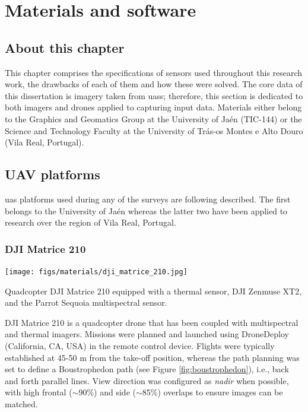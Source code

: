 \setchapterpreamble[u]{\margintoc}
\chapter{Materials and software}
\label{sec:materials}

\section*{About this chapter}

This chapter comprises the specifications of sensors used throughout this research work, the drawbacks of each of them and how these were solved. The core data of this dissertation is imagery taken from \acrshort{uas}s; therefore, this section is dedicated to both imagers and drones applied to capturing input data. Materials either belong to the Graphics and Geomatics Group at the University of Jaén (TIC-144) or the Science and Technology Faculty at the University of Trás-os Montes e Alto Douro (Vila Real, Portugal). 

\section{UAV platforms}

\acrshort{uas} platforms used during any of the surveys are following described. The first belongs to the University of Jaén whereas the latter two have been applied to research over the region of Vila Real, Portugal.

\subsection{DJI Matrice 210}

\begin{marginfigure}[.1cm]
	\texttt{[image: figs/materials/dji\_matrice\_210.jpg]}
	\caption{Quadcopter DJI Matrice 210 equipped with a thermal sensor, DJI Zenmuse XT2, and the Parrot Sequoia multispectral sensor.}
    \label{fig:dji_matrice_210}
\end{marginfigure}
DJI Matrice 210 is a quadcopter drone that has been coupled with multispectral and thermal imagers. Missions were planned and launched using DroneDeploy (California, CA, USA) in the remote control device. Flights were typically established at 45-50 \si{\meter} from the take-off position, whereas the path planning was set to define a Boustrophedon path (see Figure \ref{fig:boustrophedon}), i.e., back and forth parallel lines. View direction was configured as \textit{nadir} when possible, with high frontal ($\sim$90\%) and side ($\sim$85\%) overlaps to ensure images can be matched.

